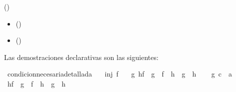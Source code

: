 \begin{isabellebody}
\begin{isamarkuptext}
\begin{itemize}
      \hfill ()
  \end{itemize} 
  \begin{itemize}
    \item[]  
      \hfill ()
  \end{itemize} 
  \begin{itemize}
    \item[]  
      \hfill ()
  \end{itemize}%
\end{isamarkuptext}\isamarkuptrue%
%
\isadelimdocument
%
\endisadelimdocument
%
\isatagdocument
%
\isamarkuptrue%
%
\endisatagdocument
{\isafolddocument}%
%
\isadelimdocument
%
\endisadelimdocument
%
\begin{isamarkuptext}%
Las demostraciones declarativas son las siguientes:%
\end{isamarkuptext}\isamarkuptrue%
\isamarkupfalse%
\ condicion{\isacharunderscore}necesaria{\isacharunderscore}detallada{\isacharcolon}\isanewline
\ \ \ {\isachardoublequoteopen}inj\ f{\isachardoublequoteclose}\isanewline
\ \ \ {\isachardoublequoteopen}{\isasymforall}g\ h{\isachardot}{\isacharparenleft}f\ {\isasymcirc}\ g\ {\isacharequal}\ f\ {\isasymcirc}\ h{\isacharparenright}\ {\isasymlongrightarrow}\ {\isacharparenleft}g\ {\isacharequal}\ h{\isacharparenright}{\isachardoublequoteclose}\isanewline
%
\isadelimproof
%
\endisadelimproof
%
\isatagproof
{}\isamarkupfalse%
\isanewline
\ \ \isamarkupfalse%
\ g{\isacharcolon}{\isacharcolon}\ {\isachardoublequoteopen}{\isacharprime}c\ {\isasymRightarrow}\ {\isacharprime}a{\isachardoublequoteclose}\isanewline
\ \ \isamarkupfalse%
\ {\isachardoublequoteopen}{\isasymforall}h{\isachardot}{\isacharparenleft}f\ {\isasymcirc}\ g\ {\isacharequal}\ f\ {\isasymcirc}\ h{\isacharparenright}\ {\isasymlongrightarrow}\ {\isacharparenleft}g\ {\isacharequal}\ h{\isacharparenright}{\isachardoublequoteclose}\isanewline

\end{isabellebody}
